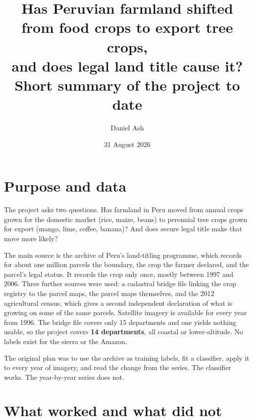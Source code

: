 \documentclass[11pt,a4paper]{article}
\title{\textbf{Has Peruvian farmland shifted from food crops to export tree crops,\\
and does legal land title cause it?}\\[0.4em]
\large Short summary of the project to date}
\author{Daniel Ash}
\date{31 August 2026}
\begin{document}
\maketitle
\vspace{-1.2em}

\section{Purpose and data}

The project asks two questions. Has farmland in Peru moved from annual crops grown for the domestic
market (rice, maize, beans) to perennial tree crops grown for export (mango, lime, coffee, banana)?
And does secure legal title make that move more likely?

The main source is the archive of Peru's land-titling programme, which records for about one
million parcels the boundary, the crop the farmer declared, and the parcel's legal status. It
records the crop only once, mostly between 1997 and 2006. Three further sources were used: a
cadastral bridge file linking the crop registry to the parcel maps, the parcel maps themselves, and
the 2012 agricultural census, which gives a second independent declaration of what is growing on
some of the same parcels. Satellite imagery is available for every year from 1996. The bridge file
covers only 15 departments and one yields nothing usable, so the project covers \textbf{14
departments}, all coastal or lower-altitude. No labels exist for the sierra or the Amazon.

The original plan was to use the archive as training labels, fit a classifier, apply it to every
year of imagery, and read the change from the series. The classifier works. The year-by-year series
does not.

\section{What worked and what did not}
\end{document}
